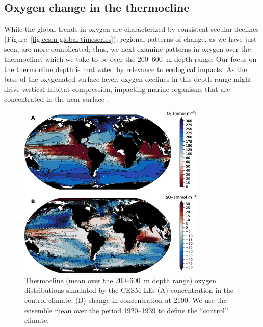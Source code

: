 \documentclass{report_chapter}
\begin{document}
\subsection{Oxygen change in the thermocline}

While the global trends in oxygen are characterized by consistent secular declines (Figure~\ref{fig:cesm-global-timeseries}), regional patterns of change, as we have just seen, are more complicated; thus, we next examine patterns in oxygen over the thermocline, which we take to be over the 200--600~m depth range.
Our focus on the thermocline depth is motivated by relevance to ecological impacts.
As the base of the oxygenated surface layer, oxygen declines in this depth range might drive vertical habitat compression, impacting marine organisms that are concentrated in the near surface \citep{Stramma-Prince-etal-2011,Deutsch-Ferrel-etal-2015}.

\begin{figure}[tbp]
\centering
\includegraphics[width=0.8\textwidth]{cesm-thermocline-o2-change.png}
\caption{Thermocline (mean over the 200--600~m depth range) oxygen distributions simulated by the CESM-LE: (A) \OO{} concentration in the control climate; (B) change in \OO{} concentration at 2100.
We use the ensemble mean over the period 1920--1939 to define the ``control'' climate.}
\label{fig:cesm-thermocline-o2-change}
\end{figure}
\end{document}

